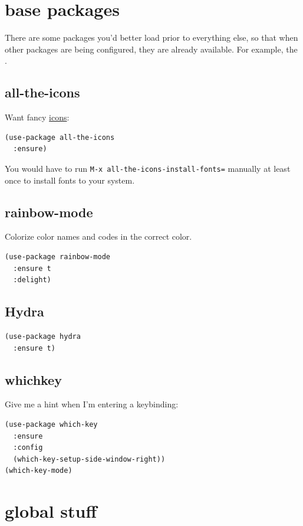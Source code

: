 \documentclass[11pt]{article}
\begin{document}
\section{base packages}
\label{sec:org1075415}

There are some packages you'd better load prior to everything else, so
that when other packages are being configured, they are already
available. For example, the .

\subsection{all-the-icons}
\label{sec:orgf73e607}

Want fancy \href{https://github.com/domtronn/all-the-icons.el\#installation}{icons}:
\begin{verbatim}
(use-package all-the-icons
  :ensure)
\end{verbatim}

You would have to run \texttt{M-x all-the-icons-install-fonts=} manually at
least once to install fonts to your system.

\subsection{rainbow-mode}
\label{sec:orgd9a25c9}

Colorize color names and codes in the correct color.

\begin{verbatim}
(use-package rainbow-mode
  :ensure t
  :delight)
\end{verbatim}
\subsection{Hydra}
\label{sec:org19b8c05}
\begin{verbatim}
(use-package hydra
  :ensure t)
\end{verbatim}
\subsection{whichkey}
\label{sec:org3eae559}

Give me a hint when I'm entering a keybinding:
\begin{verbatim}
(use-package which-key
  :ensure
  :config
  (which-key-setup-side-window-right))
(which-key-mode)
\end{verbatim}
\section{global stuff}
\label{sec:org3d53629}
\end{document}
